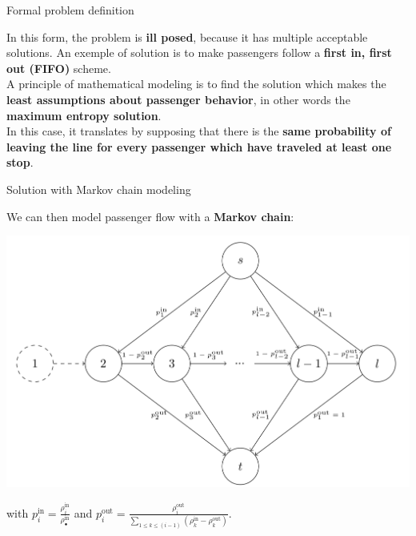 \documentclass[10pt]{beamer}
\newcommand{\imp}[1]{\textbf{\color{cyan}#1}}
\begin{document}
	
	\begin{frame}{Formal problem definition}
		
		In this form, the problem is \imp{ill posed}, because it has multiple acceptable solutions. An exemple of solution is to make passengers follow a \imp{first in, first out (FIFO)} scheme. \\
		\vspace{0.4cm}
		A principle of mathematical modeling is to find the solution which makes the \imp{least assumptions about passenger behavior}, in other words the \imp{maximum entropy solution}. \\
		\vspace{0.4cm}
		In this case, it translates by supposing that there is the \imp{same probability of leaving the line for every passenger which have traveled at least one stop}.
		
	\end{frame}
	
	
	\begin{frame}{Solution with Markov chain modeling}
		
		We can then model passenger flow with a \imp{Markov chain}:
		
		\begin{center}
			\includegraphics[width=0.8\linewidth]{img/line_markov.png} 
		\end{center}
		
		with $p^\text{in}_i = \frac{\rho^\text{in}_i}{\rho^\text{in}_\bullet}$ and $p^\text{out}_i = \frac{\rho^\text{out}_i}{\sum_{1 \leq k \leq (i-1)} (\rho^\text{in}_k - \rho^\text{out}_k)}$.
	\end{frame}
	
\end{document}
